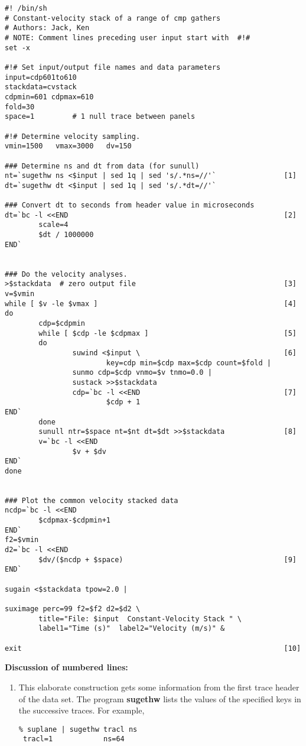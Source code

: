 {{{{{{{{\small\begin{verbatim}
#! /bin/sh
# Constant-velocity stack of a range of cmp gathers
# Authors: Jack, Ken
# NOTE: Comment lines preceding user input start with  #!#
set -x

#!# Set input/output file names and data parameters
input=cdp601to610
stackdata=cvstack
cdpmin=601 cdpmax=610
fold=30
space=1         # 1 null trace between panels

#!# Determine velocity sampling.
vmin=1500   vmax=3000   dv=150

### Determine ns and dt from data (for sunull)
nt=`sugethw ns <$input | sed 1q | sed 's/.*ns=//'`                [1]
dt=`sugethw dt <$input | sed 1q | sed 's/.*dt=//'`

### Convert dt to seconds from header value in microseconds
dt=`bc -l <<END                                                   [2]
        scale=4
        $dt / 1000000
END`


### Do the velocity analyses.
>$stackdata  # zero output file                                   [3]
v=$vmin
while [ $v -le $vmax ]                                            [4]
do
        cdp=$cdpmin
        while [ $cdp -le $cdpmax ]                                [5]
        do
                suwind <$input \                                  [6]
                        key=cdp min=$cdp max=$cdp count=$fold |
                sunmo cdp=$cdp vnmo=$v tnmo=0.0 |
                sustack >>$stackdata
                cdp=`bc -l <<END                                  [7]                               
                        $cdp + 1
END`
        done
        sunull ntr=$space nt=$nt dt=$dt >>$stackdata              [8]
        v=`bc -l <<END
                $v + $dv
END`
done


### Plot the common velocity stacked data
ncdp=`bc -l <<END
        $cdpmax-$cdpmin+1
END`
f2=$vmin
d2=`bc -l <<END
        $dv/($ncdp + $space)                                      [9]
END`

sugain <$stackdata tpow=2.0 |

suximage perc=99 f2=$f2 d2=$d2 \
        title="File: $input  Constant-Velocity Stack " \
        label1="Time (s)"  label2="Velocity (m/s)" & 

exit                                                              [10]
\end{verbatim}}\noindent
{\bf Discussion of numbered lines:}

\begin{enumerate}
\item This elaborate construction gets some information
from the first trace header of the data set.  The program {\bf sugethw}
lists the values of the specified keys in the successive traces.  For
example,
{\small\begin{verbatim}
% suplane | sugethw tracl ns
 tracl=1            ns=64       


\end{verbatim}}
\end{enumerate}}}}}}}}
